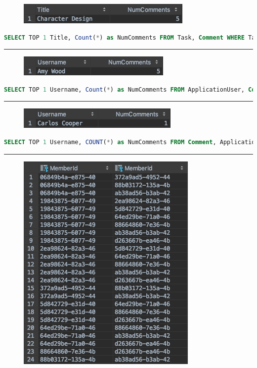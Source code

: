 \documentclass[letterpaper]{article}
\begin{document}
\begin{figure}[H]
\centering
\includegraphics[scale=0.5]{Images/MostActiveTask-Comments}
\end{figure}
\begin{lstlisting}[language=SQL, caption=Select Most Active Task (Comments)]
SELECT TOP 1 Title, Count(*) as NumComments FROM Task, Comment WHERE Task.Id=Comment.TaskId GROUP BY Title ORDER BY NumComments DESC;
\end{lstlisting}
\hrule
\begin{figure}[H]
\centering
\includegraphics[scale=0.5]{Images/MostActiveUser-Comments}
\end{figure}
\begin{lstlisting}[language=SQL, caption=Select Most Active User (Comments)]
SELECT TOP 1 Username, Count(*) as NumComments FROM ApplicationUser, Comment WHERE ApplicationUser.Id=Comment.OwnerId GROUP BY Username ORDER BY NumComments desc;
\end{lstlisting}
\hrule
\begin{figure}[H]
\centering
\includegraphics[scale=0.5]{Images/LeastActiveUser-Comments}
\end{figure}
\begin{lstlisting}[language=SQL, caption=Select Least Active User (Comments)]
SELECT TOP 1 Username, COUNT(*) as NumComments FROM Comment, ApplicationUser WHERE ApplicationUser.Id = Comment.OwnerId GROUP BY Username ORDER BY NumComments ASC;
\end{lstlisting}
\hrule
\begin{figure}[H]
\centering
\includegraphics[scale=0.5]{Images/UserPairs-Board}
\end{figure}
\end{document}
